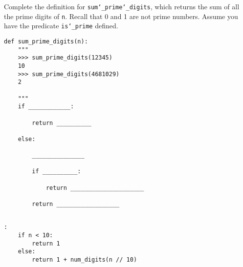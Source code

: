 \begin{blocksection}
\question Complete the definition for \texttt{sum\char`_prime\char`_digits}, which returns the sum of  all the prime digits of \texttt{n}. Recall that 0 and 1 are not prime numbers. Assume you have the predicate \texttt{is\char`_prime} defined.


\begin{lstlisting}
def sum_prime_digits(n):
    """
    >>> sum_prime_digits(12345)
    10
    >>> sum_prime_digits(4681029)
    2

    """
    if ____________:
		
        return __________
			
    else:
		
        _______________
				
        if __________:
				
            return _____________________
						
        return __________________
				
\end{lstlisting}

\begin{solution}[1in]
\begin{lstlisting}:
    if n < 10:
        return 1
    else:
        return 1 + num_digits(n // 10)
\end{lstlisting}
\end{solution}
\end{blocksection}
